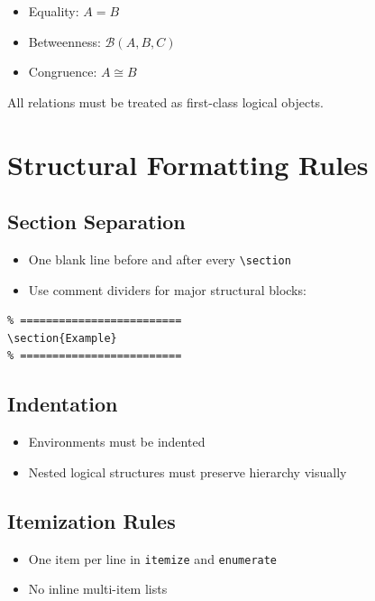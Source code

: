 \documentclass{book}
\begin{document}
\begin{itemize}
    \item Equality: $A = B$
    \item Betweenness: $\mathcal{B}(A,B,C)$
    \item Congruence: $A \cong B$
\end{itemize}

All relations must be treated as first-class logical objects.

\section{Structural Formatting Rules}

\subsection{Section Separation}

\begin{itemize}
    \item One blank line before and after every \texttt{\textbackslash section}
    \item Use comment dividers for major structural blocks:
\end{itemize}

\begin{verbatim}
% =========================
\section{Example}
% =========================
\end{verbatim}

\subsection{Indentation}

\begin{itemize}
    \item Environments must be indented
    \item Nested logical structures must preserve hierarchy visually
\end{itemize}

\subsection{Itemization Rules}

\begin{itemize}
    \item One item per line in \texttt{itemize} and \texttt{enumerate}
    \item No inline multi-item lists
\end{itemize}
\end{document}
